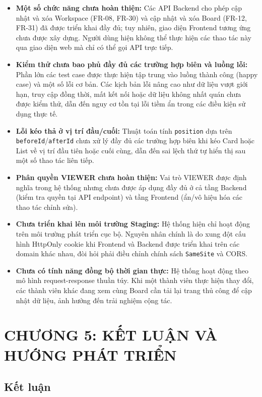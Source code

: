 \begin{itemize}
    \item \textbf{Một số chức năng chưa hoàn thiện:} Các API Backend cho phép cập nhật và xóa Workspace (FR-08, FR-30) và cập nhật và xóa Board (FR-12, FR-31) đã được triển khai đầy đủ; tuy nhiên, giao diện Frontend tương ứng chưa được xây dựng. Người dùng hiện không thể thực hiện các thao tác này qua giao diện web mà chỉ có thể gọi API trực tiếp.
    \item \textbf{Kiểm thử chưa bao phủ đầy đủ các trường hợp biên và luồng lỗi:} Phần lớn các test case được thực hiện tập trung vào luồng thành công (happy case) và một số lỗi cơ bản. Các kịch bản lỗi nâng cao như dữ liệu vượt giới hạn, truy cập đồng thời, mất kết nối hoặc dữ liệu không nhất quán chưa được kiểm thử, dẫn đến nguy cơ tồn tại lỗi tiềm ẩn trong các điều kiện sử dụng thực tế.
    \item \textbf{Lỗi kéo thả ở vị trí đầu/cuối:} Thuật toán tính \texttt{position} dựa trên \texttt{beforeId}/\texttt{afterId} chưa xử lý đầy đủ các trường hợp biên khi kéo Card hoặc List về vị trí đầu tiên hoặc cuối cùng, dẫn đến sai lệch thứ tự hiển thị sau một số thao tác liên tiếp.
    \item \textbf{Phân quyền VIEWER chưa hoàn thiện:} Vai trò VIEWER được định nghĩa trong hệ thống nhưng chưa được áp dụng đầy đủ ở cả tầng Backend (kiểm tra quyền tại API endpoint) và tầng Frontend (ẩn/vô hiệu hóa các thao tác chỉnh sửa).
    \item \textbf{Chưa triển khai lên môi trường Staging:} Hệ thống hiện chỉ hoạt động trên môi trường phát triển cục bộ. Nguyên nhân chính là do xung đột cấu hình HttpOnly cookie khi Frontend và Backend được triển khai trên các domain khác nhau, đòi hỏi phải điều chỉnh chính sách \texttt{SameSite} và CORS.
    \item \textbf{Chưa có tính năng đồng bộ thời gian thực:} Hệ thống hoạt động theo mô hình request-response thuần túy. Khi một thành viên thực hiện thay đổi, các thành viên khác đang xem cùng Board cần tải lại trang thủ công để cập nhật dữ liệu, ảnh hưởng đến trải nghiệm cộng tác.
\end{itemize}

\clearpage

\section{CHƯƠNG 5: KẾT LUẬN VÀ HƯỚNG PHÁT TRIỂN}

\subsection{Kết luận}

